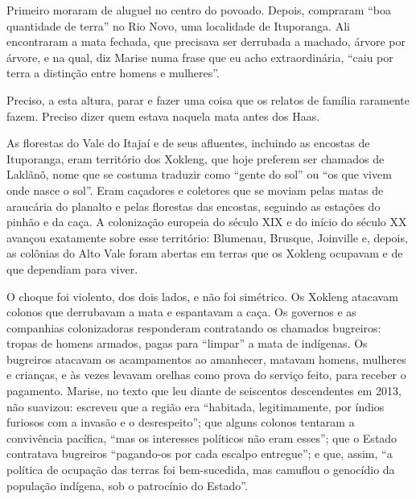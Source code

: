 \documentclass[
  brazilian,
  11pt,
  openany]{book}
\begin{document}
Primeiro moraram de aluguel no centro do povoado. Depois, compraram
``boa quantidade de terra'' no Rio Novo, uma localidade de Ituporanga.
Ali encontraram a mata fechada, que precisava ser derrubada a machado,
árvore por árvore, e na qual, diz Marise numa frase que eu acho
extraordinária, ``caiu por terra a distinção entre homens e mulheres''.

Preciso, a esta altura, parar e fazer uma coisa que os relatos de
família raramente fazem. Preciso dizer quem estava naquela mata antes
dos Haas.

As florestas do Vale do Itajaí e de seus afluentes, incluindo as
encostas de Ituporanga, eram território dos Xokleng, que hoje preferem
ser chamados de Laklãnõ, nome que se costuma traduzir como ``gente do
sol'' ou ``os que vivem onde nasce o sol''. Eram caçadores e coletores
que se moviam pelas matas de araucária do planalto e pelas florestas das
encostas, seguindo as estações do pinhão e da caça. A colonização
europeia do século XIX e do início do século XX avançou exatamente sobre
esse território: Blumenau, Brusque, Joinville e, depois, as colônias do
Alto Vale foram abertas em terras que os Xokleng ocupavam e de que
dependiam para viver.

O choque foi violento, dos dois lados, e não foi simétrico. Os Xokleng
atacavam colonos que derrubavam a mata e espantavam a caça. Os governos
e as companhias colonizadoras responderam contratando os chamados
bugreiros: tropas de homens armados, pagas para ``limpar'' a mata de
indígenas. Os bugreiros atacavam os acampamentos ao amanhecer, matavam
homens, mulheres e crianças, e às vezes levavam orelhas como prova do
serviço feito, para receber o pagamento. Marise, no texto que leu diante
de seiscentos descendentes em 2013, não suavizou: escreveu que a região
era ``habitada, legitimamente, por índios furiosos com a invasão e o
desrespeito''; que alguns colonos tentaram a convivência pacífica, ``mas
os interesses políticos não eram esses''; que o Estado contratava
bugreiros ``pagando-os por cada escalpo entregue''; e que, assim, ``a
política de ocupação das terras foi bem-sucedida, mas camuflou o
genocídio da população indígena, sob o patrocínio do Estado''.
\end{document}
